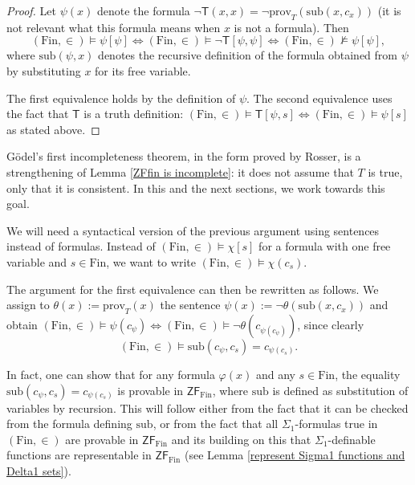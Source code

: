 \documentclass[a4paper, 11pt]{amsart}
\theoremstyle{remark}
\newcommand{\axiomft}[1]{\mathsf{#1}}
\newcommand{\ZF}{\axiomft{ZF}}
\newcommand{\Fin}{\mathrm{Fin}}
\newcommand{\prov}{\mathrm{prov}}
\newcommand{\sub}{\mathrm{sub}}
\newcommand{\cM}{\mathcal M}
\begin{document}
\begin{proof}
Let $\psi(x)$ denote the formula 
$\neg \mathsf{T}(x,x)= \neg \prov_T (\sub(x,c_x))$ (it is not relevant what this formula means when $x$ is not a formula). 
Then 
$$ (\Fin ,\in)\models \psi [\psi] \Longleftrightarrow (\Fin,\in) \models \neg \mathsf{T}[\psi,\psi] \Longleftrightarrow  (\Fin,\in) \not\models \psi [\psi],$$ 
where $\mathrm{sub}(\psi,x)$ denotes the recursive definition of the formula obtained from $\psi$ by substituting $x$ for its free variable. 

The first equivalence holds by the definition of $\psi$. 
The second equivalence uses the fact that $\mathsf{T}$ is a truth definition: 
$(\Fin,\in) \models \mathsf{T}[\psi,s] \Longleftrightarrow (\Fin,\in) \models \psi[s]$ as stated above. 
\end{proof} 


G\"odel's first incompleteness theorem, in the form proved by Rosser, is a strengthening of Lemma \ref{ZFfin is incomplete}: it does not assume that $T$ is true, only that it is consistent. 
In this and the next sections, we work towards this goal.  

We will need a syntactical version of the previous argument using sentences instead of formulas. 
Instead of $(\Fin,\in)\models \chi[s]$ for a formula with one free variable and $s\in \Fin$, we want to write $(\Fin,\in)\models \chi(c_s)$. 

The argument for the first equivalence can then be rewritten as follows. 
We assign to $\theta(x):=\prov_T(x)$ the sentence $\psi(x):=\neg \theta(\mathrm{sub}(x,c_x))$ and obtain $(\Fin,\in)\models\psi(c_\psi) \Longleftrightarrow (\Fin,\in)\models\neg \theta(c_{\psi(c_\psi)})$, since clearly 
$$(\Fin,\in)\models\sub(c_\psi,c_s) = c_{\psi(c_s)}.$$ 

In fact, one can show that for any formula $\varphi(x)$ and any $s\in \Fin$, the equality $\mathrm{sub}(c_\psi,c_s) = c_{\psi(c_s)}$ is provable in $\ZF_{\Fin}$, where $\sub$ is defined as substitution of variables by recursion. 
This will follow either from the fact that it can be checked from the formula defining $\sub$, or from the fact that all $\Sigma_1$-formulas true in $(\Fin,\in)$ are provable in $\ZF_{\Fin}$ and its building on this that $\Sigma_1$-definable functions are representable in $\ZF_\Fin$ (see Lemma \ref{represent Sigma1 functions and Delta1 sets}). 
\end{document}
